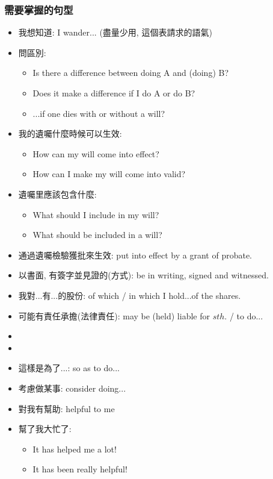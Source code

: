 \subsubsection*{需要掌握的句型}
\begin{itemize}
  \itemsep0em
  \item 我想知道: I wander... (盡量少用, 這個表請求的語氣)
  \item 問區別:
  \begin{itemize}
  \itemsep0em
  	\item Is there a difference between doing A and (doing) B?
  	\item Does it make a difference if I do A or do B?
  	\item ...if one dies with or without a will?
  \end{itemize}
  \item 我的遺囑什麼時候可以生效:
  \begin{itemize}
  \itemsep0em
  	\item How can my will come into effect?
  	\item How can I make my will come into valid?
  \end{itemize}
  \item 遺囑里應該包含什麼:
  \begin{itemize}
  \itemsep0em
  	\item What should I include in my will?
  	\item What should be included in a will?
  \end{itemize}
  \item 通過遺囑檢驗獲批來生效: put into effect by a grant of probate.
  \item 以書面, 有簽字並見證的(方式): be in writing, signed and witnessed.
  \item 我對...有...的股份: of which / in which I hold...of the shares.
  \item 可能有責任承擔(法律責任): may be (held) liable for $sth.$ / to do...
  \item {}
  \item {}
  \item 這樣是為了...: so as to do...
  \item 考慮做某事: consider doing...
  \item 對我有幫助: helpful to me
  \item 幫了我大忙了:
  \begin{itemize}
  \itemsep0em
  	\item It has helped me a lot!
  	\item It has been really helpful!
  \end{itemize}
\end{itemize}

